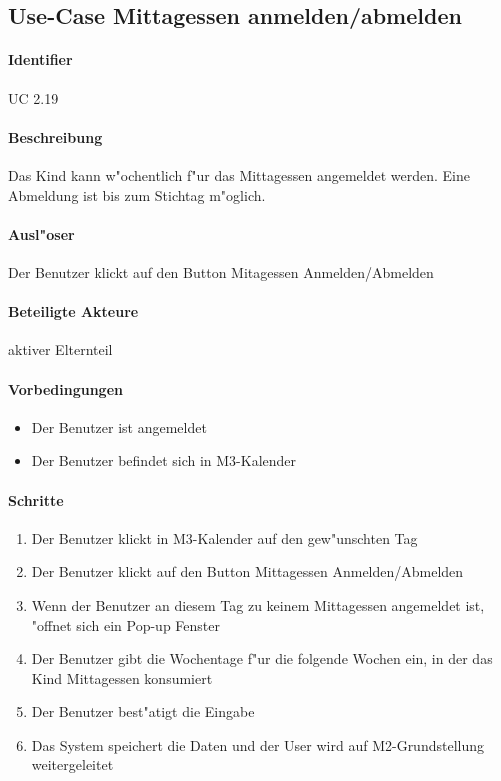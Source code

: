   
  \newpage
 \subsection{Use-Case Mittagessen anmelden/abmelden}
  \paragraph{Identifier}
  UC 2.19
  \paragraph{Beschreibung}
  Das Kind kann w"ochentlich f"ur das Mittagessen angemeldet werden. Eine Abmeldung ist bis zum Stichtag m"oglich.
  \paragraph{Ausl"oser}
  Der Benutzer klickt auf den Button Mitagessen Anmelden/Abmelden
  \paragraph{Beteiligte Akteure}   \leavevmode \newline
    aktiver Elternteil
  \paragraph{Vorbedingungen}
  \begin{itemize}
   \item Der Benutzer ist angemeldet
   \item Der Benutzer befindet sich in M3-Kalender
  \end{itemize}

  \paragraph{Schritte}
  \begin{enumerate}
   \item Der Benutzer klickt in M3-Kalender auf den gew"unschten Tag
   \item Der Benutzer klickt auf den Button \dq Mittagessen Anmelden/Abmelden\dq
   \item Wenn der Benutzer an diesem Tag zu keinem Mittagessen angemeldet ist, "offnet sich ein Pop-up Fenster
   \item Der Benutzer gibt die Wochentage f"ur die folgende Wochen ein, in der das Kind Mittagessen konsumiert
   \item Der Benutzer best"atigt die Eingabe
   \item Das System speichert die Daten und der User wird auf M2-Grundstellung weitergeleitet
  \end{enumerate}

